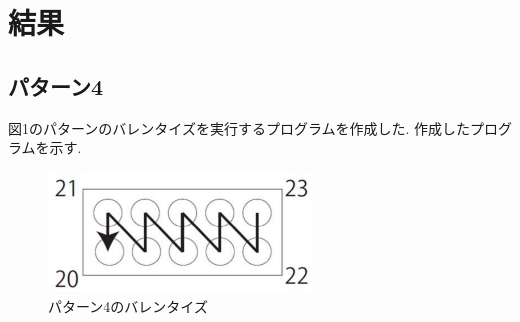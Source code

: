 \documentclass[10pt,a4j]{jsarticle}
\begin{document}
\section{結果}
  \subsection{パターン4}
  図1のパターンのバレンタイズを実行するプログラムを作成した.
  作成したプログラムを示す.

    \begin{figure}[H]
      \centering
      \includegraphics[width=7cm]{../img/pattern4.png}
      \caption{パターン4のバレンタイズ}
    \end{figure}
\end{document}
